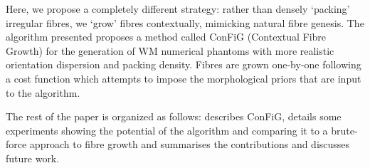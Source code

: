 Here, we propose a completely different strategy: rather than densely `packing' irregular fibres, we `grow' fibres contextually, mimicking natural fibre genesis.
The algorithm presented proposes a method called ConFiG (Contextual Fibre Growth) for the generation of WM numerical phantoms with more realistic orientation dispersion and packing density.
Fibres are grown one-by-one following a cost function which attempts to impose the morphological priors that are input to the algorithm.

The rest of the paper is organized as follows:  describes ConFiG,  details some experiments showing the potential of the algorithm and comparing it to a brute-force approach to fibre growth and  summarises the contributions and discusses future work.


